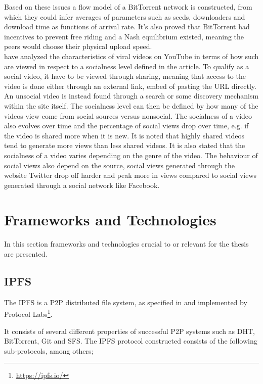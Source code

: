 Based on these issues a flow model of a BitTorrent network is constructed, from which they could infer averages of parameters such as seeds, downloaders and download time as functions of arrival rate. It's also proved that BitTorrent had incentives to prevent free riding and a Nash equilibrium existed, meaning the peers would choose their physical upload speed.
\\


\citeauthor{broxton2013catching} \cite{broxton2013catching} have analyzed the characteristics of viral videos on YouTube in terms of how such are viewed in respect to a socialness level defined in the article. To qualify as a social video, it have to be viewed through sharing, meaning that access to the video is done either through an external link, embed of pasting the URL directly. An unsocial video is instead found through a search or some discovery mechanism within the site itself. The socialness level can then be defined by how many of the videos view come from social sources versus nonsocial. The socialness of a video also evolves over time and the percentage of social views drop over time, e.g. if the video is shared more when it is new. It is noted that highly shared videos tend to generate more views than less shared videos. It is also stated that the socialness of a video varies depending on the genre of the video. The behaviour of social views also depend on the source, social views generated through the website Twitter drop off harder and peak more in views compared to social views generated through a social network like Facebook.


\section{Frameworks and Technologies}
\label{sec:fram-techn}
In this section frameworks and technologies crucial to or relevant for the thesis are presented.

\subsection{\acl{IPFS}}
The \ac{IPFS} is a \ac{P2P} distributed file system, as specified in \cite{benet2014ipfs} and implemented by Protocol Labs\footnote{\url{https://ipfs.io/}}.

It consists of several different properties of successful \ac{P2P} systems such as \ac{DHT}, BitTorrent, Git and \ac{SFS}. The \ac{IPFS} protocol constructed consists of the following sub-protocols, among others;

